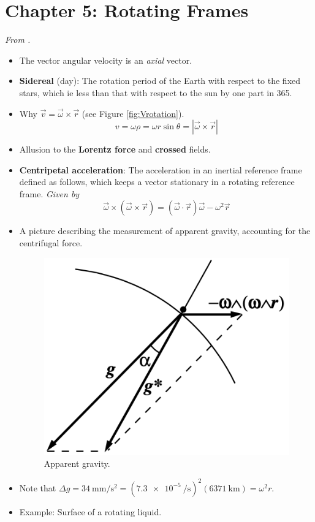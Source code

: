 \documentclass[../notes.tex]{subfiles}
\begin{document}
\section{Chapter 5: Rotating Frames}
\emph{From \textcite{bib:KibbleBerkshire}.}
\begin{itemize}
    \item {}The vector angular velocity is an \emph{axial} vector.
    \item \textbf{Sidereal} (day): The rotation period of the Earth with respect to the fixed stars, which ie less than that with respect to the sun by one part in 365.
    \item Why $\vec{v}=\vec{\omega}\times\vec{r}$ (see Figure \ref{fig:Vrotation}).
    \begin{equation*}
        v = \omega\rho = \omega r\sin\theta = |\vec{\omega}\times\vec{r}|
    \end{equation*}
    \item Allusion to the \textbf{Lorentz force} and \textbf{crossed} fields.
    \item \textbf{Centripetal acceleration}: The acceleration in an inertial reference frame defined as follows, which keeps a vector stationary in a rotating reference frame. \emph{Given by}
    \begin{equation*}
        \vec{\omega}\times(\vec{\omega}\times\vec{r}) = (\vec{\omega}\cdot\vec{r})\vec{\omega}-\omega^2\vec{r}
    \end{equation*}
    \item A picture describing the measurement of apparent gravity, accounting for the centrifugal force.
    \begin{figure}[h!]
        \centering
        \includegraphics[width=0.25\linewidth]{../ExtFiles/apparentGravity.png}
        \caption{Apparent gravity.}
        \label{fig:apparentGravity}
    \end{figure}
    \item Note that $\Delta g=\SI[per-mode=symbol]{34}{\milli\meter\per\second\squared}=(\SI{7.3e-5}{\per\second})^2(\SI{6371}{\kilo\meter})=\omega^2r$.
    \item Example: Surface of a rotating liquid.
    \begin{itemize}

\end{itemize}
\end{itemize}
\end{document}
